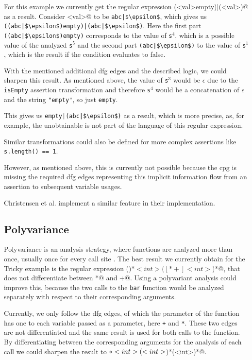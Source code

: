 For this example we currently get the regular expression \Verb@(<val>empty)|(<val>)@ as a result. 
Consider \Verb@<val>@ to be \lstinline[mathescape]@abc|$\epsilon$@, which gives us \lstinline[mathescape]@((abc|$\epsilon$)empty)|(abc|$\epsilon$)@.
Here the first part \lstinline[mathescape]@((abc|$\epsilon$)empty)@ corresponds to the value of \lstinline|s|$^4$, which is a possible value of the analyzed \lstinline|s|$^5$ and the second part \lstinline[mathescape]@(abc|$\epsilon$)@ to the value of \lstinline|s|$^1$, which is the result if the condition evaluates to false.

With the mentioned additional \ac{dfg} edges and the described logic, we could sharpen this result.
As mentioned above, the value of \lstinline|s|$^3$ would be $\epsilon$ due to the \lstinline|isEmpty| assertion transformation and therefore \lstinline|s|$^4$ would be a concatenation of $\epsilon$ and the string \lstinline|"empty"|, so just \lstinline|empty|.

This gives us \lstinline[mathescape]@empty|(abc|$\epsilon$)@ as a result, which is more precise, as, for example, the unobtainable \Verb@abcempty@ is not part of the language of this regular expression.

Similar transformations could also be defined for more complex assertions like \lstinline|s.length() == 1|.

However, as mentioned above, this is currently not possible because the \ac{cpg} is missing the required \ac{dfg} edges representing this implicit information flow from an assertion to subsequent variable usages. 

Christensen et al. implement a similar feature in their implementation.

\subsection{Polyvariance}\label{sec:futureWork:polyvariance}

Polyvariance is an analysis strategy, where functions are analyzed more than once, usually once for every call site \cite{polyvariance}. The best result we currently obtain for the Tricky example is the regular expression \Verb@(\()*<int>([*+]<int>\))*@, that does not differentiate between \Verb@*@ and \Verb@+@. Using a polyvariant analysis could improve this, because the two calls to the \lstinline|bar| function would be analyzed separately with respect to their corresponding arguments. 

Currently, we only follow the \ac{dfg} edges, of which the parameter of the function has one to each variable passed as a parameter, here \lstinline|+| and \lstinline|*|. These two edges are not differentiated and the same result is used for both calls to the function.
By differentiating between the corresponding arguments for the analysis of each call we could sharpen the result to \Verb@\(*<int>(\*<int>\))*(\+<int>\))*@.

